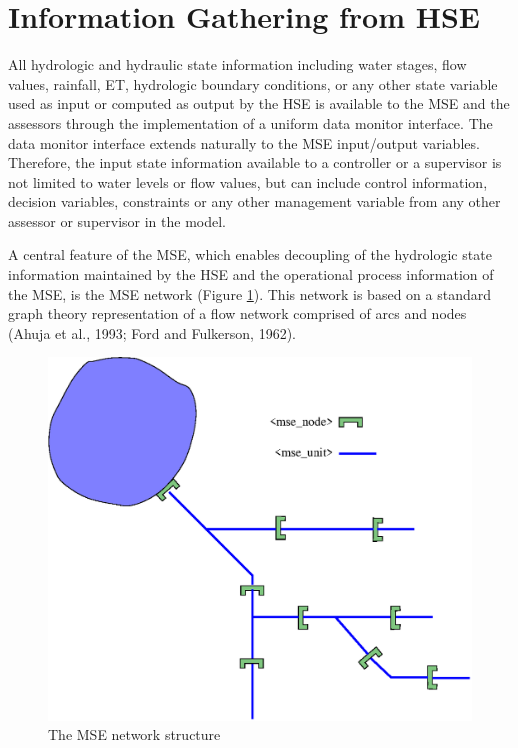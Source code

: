 \section{Information Gathering from HSE}

All hydrologic and hydraulic state information including water stages,
flow values, rainfall, ET, hydrologic boundary conditions, or any
other state variable used as input or computed as output by the HSE is
available to the MSE and the assessors through the implementation of a
uniform data monitor interface. The data monitor interface extends
naturally to the MSE input/output variables. Therefore, the input
state information available to a controller or a supervisor is not
limited to water levels or flow values, but can include control
information, decision variables, constraints or any other management
variable from any other assessor or supervisor in the model.  

A central feature of the MSE, which enables decoupling of the
hydrologic state information maintained by the HSE and the operational
process information of the MSE, is the MSE network (Figure
\ref{Fig:mseNetwork}).  This network is based on a standard graph
theory representation of a flow network comprised of arcs and nodes
(Ahuja et al., 1993; Ford and Fulkerson,
1962)\nocite{Ahuja:93}\nocite{Ford:62}.

\begin{figure}
 \begin{center}
  \includegraphics[scale=0.5]{Graphics/mseNetwork.eps}
 \end{center}
 \caption{\label{Fig:mseNetwork} The MSE network structure}        
\end{figure}

